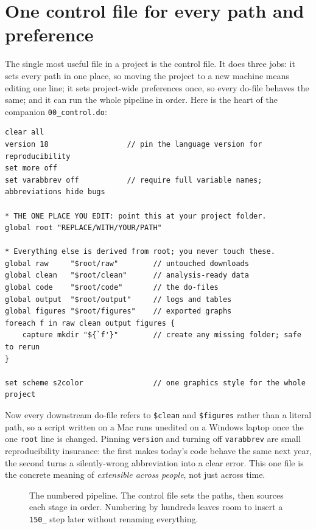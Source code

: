 \documentclass[
    a4paper,
    fontsize=10pt,
    twoside=true,
    numbers=noenddot,
]{kaobook}
\begin{document}
\section{One control file for every path and preference}\label{sec:control}
The single most useful file in a project is the control file. It does three jobs: it sets every path in one place, so moving the project to a new machine means editing one line; it sets project-wide preferences once, so every do-file behaves the same; and it can run the whole pipeline in order. Here is the heart of the companion \texttt{00\_control.do}:
{\footnotesize
\begin{verbatim}
clear all
version 18                  // pin the language version for reproducibility
set more off
set varabbrev off           // require full variable names; abbreviations hide bugs

* THE ONE PLACE YOU EDIT: point this at your project folder.
global root "REPLACE/WITH/YOUR/PATH"

* Everything else is derived from root; you never touch these.
global raw     "$root/raw"        // untouched downloads
global clean   "$root/clean"      // analysis-ready data
global code    "$root/code"       // the do-files
global output  "$root/output"     // logs and tables
global figures "$root/figures"    // exported graphs
foreach f in raw clean output figures {
    capture mkdir "${`f'}"        // create any missing folder; safe to rerun
}

set scheme s2color                // one graphics style for the whole project
\end{verbatim}
}
Now every downstream do-file refers to \texttt{\$clean} and \texttt{\$figures} rather than a literal path, so a script written on a Mac runs unedited on a Windows laptop once the one \texttt{root} line is changed. Pinning \texttt{version} and turning off \texttt{varabbrev} are small reproducibility insurance: the first makes today's code behave the same next year, the second turns a silently-wrong abbreviation into a clear error. This one file is the concrete meaning of \emph{extensible across people}, not just across time.

\begin{figure}[htbp]
\centering
{}
\caption[The numbered pipeline]{The numbered pipeline. The control file sets the paths, then sources each stage in order. Numbering by hundreds leaves room to insert a \texttt{150\_} step later without renaming everything.}
\label{fig:numbered}
\end{figure}
\end{document}
